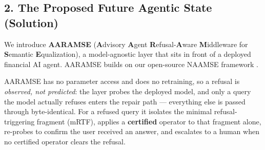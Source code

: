 %

\subsection*{2. The Proposed Future Agentic State (Solution)}

\begin{sloppypar}
We introduce \textbf{AARAMSE} (\textbf{A}dvisory \textbf{A}gent \textbf{R}efusal-\textbf{A}ware
\textbf{M}iddleware for \textbf{S}emantic \textbf{E}qualization), a model-agnostic
layer that sits in front of a deployed financial AI agent. AARAMSE builds on our
open-source NAAMSE framework \cite{pai2026naamse}.
\end{sloppypar}

AARAMSE has no parameter access and does no retraining, so a refusal is
\emph{observed, not predicted}: the layer probes the deployed model, and only a
query the model actually refuses enters the repair path --- everything else is
passed through byte-identical. For a refused query it isolates the minimal
refusal-triggering fragment (mRTF), applies a \textbf{certified} operator to that
fragment alone, re-probes to confirm the user received an answer, and escalates
to a human when no certified operator clears the refusal.

